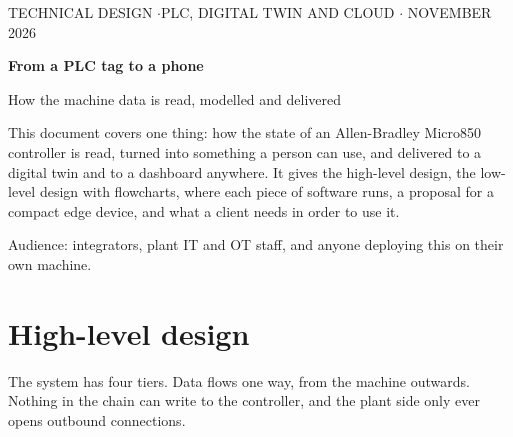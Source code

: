 \documentclass[a4paper,10.5pt]{article}
\begin{document}
\thispagestyle{empty}
{\small\color{sub}TECHNICAL DESIGN \quad$\cdot$\quad PLC, DIGITAL TWIN AND CLOUD \quad$\cdot$ NOVEMBER 2026}

\vspace{4mm}
{\Huge\bfseries From a PLC tag to a phone\par}
\vspace{1mm}
{\LARGE\color{sub} How the machine data is read, modelled and delivered\par}
\vspace{5mm}
This document covers one thing: how the state of an Allen-Bradley Micro850 controller is read, turned into
something a person can use, and delivered to a digital twin and to a dashboard anywhere. It gives the
high-level design, the low-level design with flowcharts, where each piece of software runs, a proposal for a
compact edge device, and what a client needs in order to use it.

{\small\color{sub}Audience: integrators, plant IT and OT staff, and anyone deploying this on their own machine.}

\vspace{2mm}
\begin{center}
\end{center}

\tableofcontents

\section{High-level design}

The system has four tiers. Data flows one way, from the machine outwards. Nothing in the chain can write to
the controller, and the plant side only ever opens outbound connections.
\end{document}
